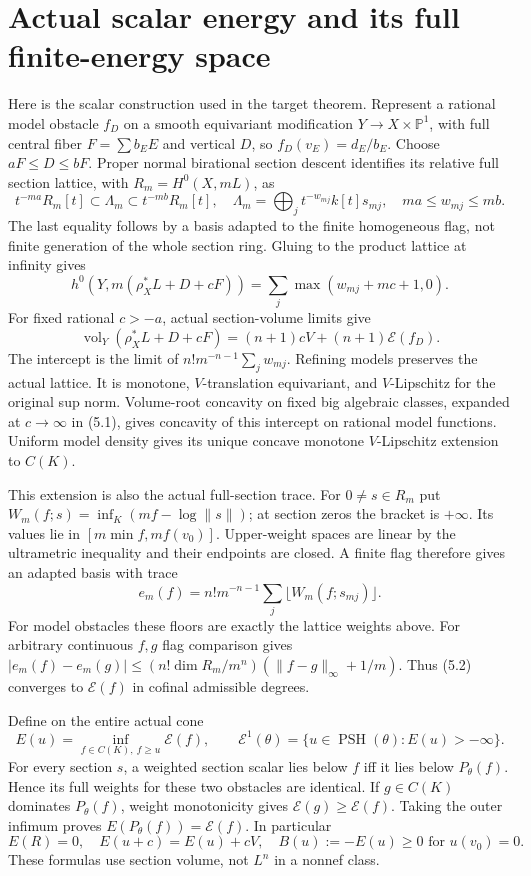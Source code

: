 \documentclass[10pt]{article}
\newcommand{\PSH}{\operatorname{PSH}}
\newcommand{\vol}{\operatorname{vol}}
\newcommand{\E}{\mathcal E}
\begin{document}
\section{Actual scalar energy and its full finite-energy space}
Here is the scalar construction used in the target theorem. Represent a
rational model obstacle $f_D$ on a smooth equivariant modification
$Y\to X\times\mathbb P^1$, with full central fiber $F=\sum b_EE$ and
vertical $D$, so $f_D(v_E)=d_E/b_E$. Choose $aF\leq D\leq bF$.
Proper normal birational section descent identifies its relative full
section lattice, with $R_m=H^0(X,mL)$, as
\[
 t^{-ma}R_m[t]\subset\Lambda_m\subset t^{-mb}R_m[t],\quad
 \Lambda_m=\bigoplus_j t^{-w_{mj}}k[t]s_{mj},\quad ma\leq w_{mj}\leq mb.
\]
The last equality follows by a basis adapted to the finite homogeneous
flag, not finite generation of the whole section ring. Gluing to the
product lattice at infinity gives
\[
 h^0(Y,m(\rho_X^*L+D+cF))=\sum_j\max(w_{mj}+mc+1,0).
\]
For fixed rational $c>-a$, actual section-volume limits give
\[
 \vol_Y(\rho_X^*L+D+cF)=(n+1)cV+(n+1)\mathscr E(f_D).
\tag{5.1}
\]
The intercept is the limit of $n!m^{-n-1}\sum_jw_{mj}$. Refining models
preserves the actual lattice. It is monotone, $V$-translation equivariant,
and $V$-Lipschitz for the original sup norm. Volume-root concavity on
fixed big algebraic classes, expanded at $c\to\infty$ in (5.1), gives
concavity of this intercept on rational model functions. Uniform model
density gives its unique concave monotone $V$-Lipschitz extension to $C(K)$.

This extension is also the actual full-section trace. For $0\ne s\in R_m$
put $W_m(f;s)=\inf_K(mf-\log\|s\|)$; at section zeros the bracket is
$+\infty$. Its values lie in $[m\min f,m f(v_0)]$. Upper-weight spaces
are linear by the ultrametric inequality and their endpoints are closed.
A finite flag therefore gives an adapted basis with trace
\[
 e_m(f)=n!m^{-n-1}\sum_j\lfloor W_m(f;s_{mj})\rfloor.
\tag{5.2}
\]
For model obstacles these floors are exactly the lattice weights above.
For arbitrary continuous $f,g$ flag comparison gives
$|e_m(f)-e_m(g)|\leq(n!\dim R_m/m^n)(\|f-g\|_\infty+1/m)$.
Thus (5.2) converges to $\mathscr E(f)$ in cofinal admissible degrees.

Define on the entire actual cone
\[
 E(u)=\inf_{f\in C(K),\ f\geq u}\mathscr E(f),\qquad
 \E^1(\theta)=\{u\in\PSH(\theta):E(u)>-\infty\}.
\tag{5.3}
\]
For every section $s$, a weighted section scalar lies below $f$ iff it
lies below $P_\theta(f)$. Hence its full weights for these two obstacles
are identical. If $g\in C(K)$ dominates $P_\theta(f)$, weight monotonicity
gives $\mathscr E(g)\geq\mathscr E(f)$. Taking the outer infimum proves
$E(P_\theta(f))=\mathscr E(f)$. In particular
\[
 E(R)=0,\quad E(u+c)=E(u)+cV,
 \quad B(u):=-E(u)\geq0\text{ for }u(v_0)=0.
\]
These formulas use section volume, not $L^n$ in a nonnef class.
\end{document}
